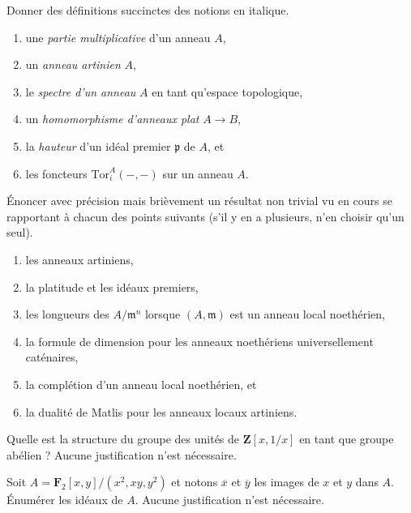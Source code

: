 \begin{exercise}[Définitions]
\label{exercise-definitions-fall-2021}
Donner des définitions succinctes des notions en italique.
\begin{enumerate}
\item une {\it partie multiplicative} d'un anneau $A$,
\item un {\it anneau artinien} $A$,
\item le {\it spectre d'un anneau} $A$ en tant qu'espace topologique,
\item un {\it homomorphisme d'anneaux plat} $A \to B$,
\item la {\it hauteur} d'un idéal premier $\mathfrak p$ de $A$, et
\item les foncteurs {\it $\text{Tor}^A_i(-, -)$} sur un anneau $A$.
\end{enumerate}
\end{exercise}

\begin{exercise}[Théorèmes]
\label{exercise-results-fall-2021}
Énoncer avec précision mais brièvement un résultat non trivial vu en cours
se rapportant à chacun des points suivants (s'il y en a plusieurs, n'en choisir
qu'un seul).
\begin{enumerate}
\item les anneaux artiniens,
\item la platitude et les idéaux premiers,
\item les longueurs des $A/\mathfrak m^n$ lorsque $(A, \mathfrak m)$ est un anneau local noethérien,
\item la formule de dimension pour les anneaux noethériens universellement caténaires,
\item la complétion d'un anneau local noethérien, et
\item la dualité de Matlis pour les anneaux locaux artiniens.
\end{enumerate}
\end{exercise}

\begin{exercise}[Unités]
\label{exercise-simple-units}
Quelle est la structure du groupe des unités de $\mathbf{Z}[x, 1/x]$
en tant que groupe abélien ? Aucune justification n'est nécessaire.
\end{exercise}

\begin{exercise}[Idéaux]
\label{exercise-ideals}
Soit $A = \mathbf{F}_2[x, y]/(x^2, xy, y^2)$ et notons
$\overline{x}$ et $\overline{y}$ les images de $x$ et $y$ dans $A$.
Énumérer les idéaux de $A$. Aucune justification n'est nécessaire.
\end{exercise}

